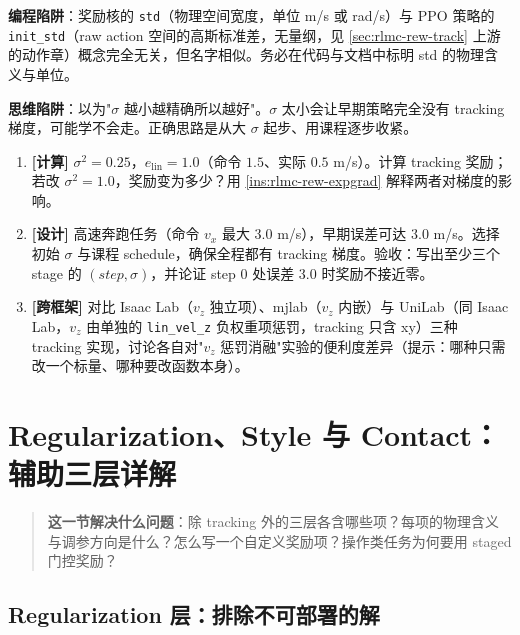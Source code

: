 \begin{pitfall}
\textbf{编程陷阱}：奖励核的 \verb|std|（物理空间宽度，单位 m/s 或 rad/s）与 PPO 策略的 \verb|init_std|（raw action 空间的高斯标准差，无量纲，见 \cref{sec:rlmc-rew-track} 上游的动作章）概念完全无关，但名字相似。务必在代码与文档中标明 std 的物理含义与单位。

\textbf{思维陷阱}：以为"$\sigma$ 越小越精确所以越好"。$\sigma$ 太小会让早期策略完全没有 tracking 梯度，可能学不会走。正确思路是从大 $\sigma$ 起步、用课程逐步收紧。
\end{pitfall}

\begin{practice}[练习·跟踪奖励]
\begin{enumerate}
  \item \textbf{[计算]} $\sigma^2=0.25$，$e_{\text{lin}}=1.0$（命令 $1.5$、实际 $0.5$ m/s）。计算 tracking 奖励；若改 $\sigma^2=1.0$，奖励变为多少？用 \cref{ins:rlmc-rew-expgrad} 解释两者对梯度的影响。
  \item \textbf{[设计]} 高速奔跑任务（命令 $v_x$ 最大 $3.0$ m/s），早期误差可达 $3.0$ m/s。选择初始 $\sigma$ 与课程 schedule，确保全程都有 tracking 梯度。验收：写出至少三个 stage 的 $(step,\sigma)$，并论证 step $0$ 处误差 $3.0$ 时奖励不接近零。
  \item \textbf{[跨框架]} 对比 Isaac Lab（$v_z$ 独立项）、mjlab（$v_z$ 内嵌）与 UniLab（同 Isaac Lab，$v_z$ 由单独的 \verb|lin_vel_z| 负权重项惩罚，tracking 只含 xy）三种 tracking 实现，讨论各自对"$v_z$ 惩罚消融"实验的便利度差异（提示：哪种只需改一个标量、哪种要改函数本身）。
\end{enumerate}
\end{practice}

\section{Regularization、Style 与 Contact：辅助三层详解}
\label{sec:rlmc-rew-aux}

\begin{quote}\small
\textbf{这一节解决什么问题}：除 tracking 外的三层各含哪些项？每项的物理含义与调参方向是什么？怎么写一个自定义奖励项？操作类任务为何要用 staged 门控奖励？
\end{quote}

\subsection{Regularization 层：排除不可部署的解}
\label{sec:rlmc-rew-reg}

